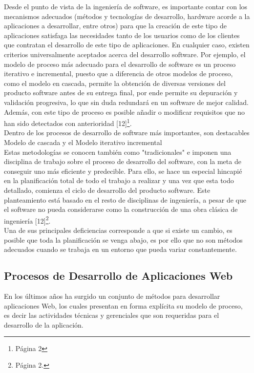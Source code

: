 Desde el punto de vista de la ingeniería de software, es importante contar con los mecanismos
adecuados (métodos y tecnologías de desarrollo, hardware acorde a la aplicaciones a desarrollar, entre
otros) para que la creación de este tipo de aplicaciones satisfaga las necesidades tanto de los usuarios 
como de los clientes que contratan el desarrollo de este tipo de aplicaciones.
En cualquier caso, existen criterios universalmente aceptados acerca del desarrollo software. Por ejemplo, 
el modelo de proceso más adecuado para el desarrollo de software es un proceso iterativo e incremental, 
puesto que a diferencia de otros modelos de proceso, como el modelo en cascada, permite la 
obtención de diversas versiones del producto software antes de su entrega final, por ende permite su depuración 
y validación progresiva, lo que sin duda redundará en un software de mejor calidad. Además, con este tipo de 
proceso es posible añadir o modificar requisitos que no han sido detectados con anterioridad [12]\footnote{Página 2}.\\

Dentro de los procesos de desarrollo de software más importantes, son destacables Modelo de cascada y el Modelo 
iterativo incremental\\

Estas metodologías se conocen también como "tradicionales" e imponen una disciplina de trabajo sobre el proceso 
de desarrollo del software, con la meta de conseguir uno más eficiente y predecible. Para ello, se hace un especial 
hincapié en la planificación total de todo el trabajo a realizar y una vez que esta todo detallado, comienza el ciclo 
de desarrollo del producto software. Este planteamiento está basado en el resto de disciplinas de ingeniería, a 
pesar de que el software no pueda considerarse como la construcción de una obra clásica de ingeniería [12]\footnote{Página 2.}.\\

Una de sus principales deficiencias corresponde a que si existe un cambio, es posible que toda la planificación se 
venga abajo, es por ello que no son métodos adecuados cuando se trabaja en un entorno que pueda variar constantemente.\\

\subsection{Procesos de Desarrollo de Aplicaciones Web}

En los últimos años ha surgido un conjunto de métodos para desarrollar aplicaciones Web, los cuales presentan 
en forma explícita su modelo de proceso, es decir las actividades técnicas y gerenciales que son requeridas para el
desarrollo de la aplicación. \\

